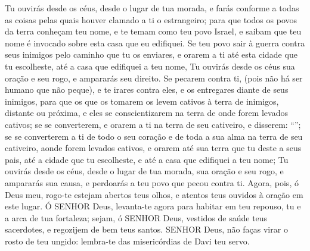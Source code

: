 {{  Tu ouvirás desde os céus, desde o lugar de tua morada, e farás conforme a todas as coisas pelas quais houver clamado a ti o estrangeiro; para que todos os povos da terra conheçam teu nome, e te temam como teu povo Israel, e saibam que teu nome é invocado sobre esta casa que eu edifiquei.
  Se teu povo sair à guerra contra seus inimigos pelo caminho que tu os enviares, e orarem a ti até esta cidade que tu escolheste, até a casa que edifiquei a teu nome,
  Tu ouvirás desde os céus sua oração e seu rogo, e ampararás seu direito.
  Se pecarem contra ti, (pois não há ser humano que não peque), e te irares contra eles, e os entregares diante de seus inimigos, para que os que os tomarem os levem cativos à terra de inimigos, distante ou próxima,
  e eles se conscientizarem na terra de onde forem levados cativos; se se converterem, e orarem a ti na terra de seu cativeiro, e disserem: \enquote{};
  se se converterem a ti de todo o seu coração e de toda a sua alma na terra de seu cativeiro, aonde forem levados cativos, e orarem até sua terra que tu deste a seus pais, até a cidade que tu escolheste, e até a casa que edifiquei a teu nome;
  Tu ouvirás desde os céus, desde o lugar de tua morada, sua oração e seu rogo, e ampararás sua causa, e perdoarás a teu povo que pecou contra ti.
  Agora, pois, ó Deus meu, rogo-te estejam abertos teus olhos, e atentos teus ouvidos à oração em este lugar.
  Ó SENHOR Deus, levanta-te agora para habitar em teu repouso, tu e a arca de tua fortaleza; sejam, ó SENHOR Deus, vestidos de saúde teus sacerdotes, e regozijem de bem teus santos.
  SENHOR Deus, não faças virar o rosto de teu ungido: lembra-te das misericórdias de Davi teu servo}.
\par }

